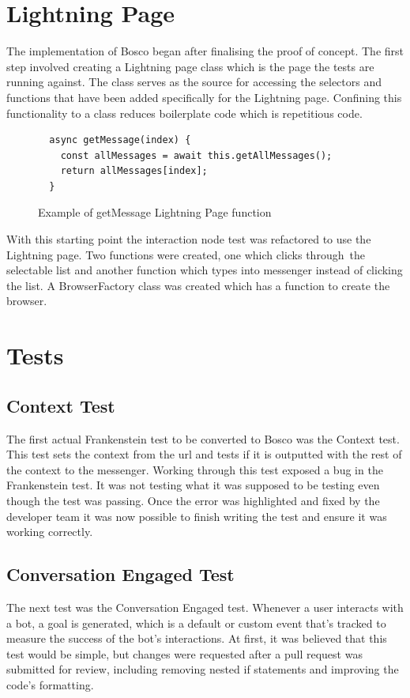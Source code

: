 \documentclass[12pt,a4paper,titlepage]{report}
\begin{document}
\section{Lightning Page}
The implementation of Bosco began after finalising the proof of concept. 
The first step involved creating a Lightning page class which is the page the tests are running against. 
The class serves as the source for accessing the selectors and functions that have been added specifically for the Lightning page. 
Confining this functionality to a class reduces boilerplate code which is repetitious code.

\begin{figure}[H]
 \begin{tcolorbox}
  \begin{verbatim}
  async getMessage(index) {
    const allMessages = await this.getAllMessages();
    return allMessages[index];
  }
  \end{verbatim}
 \end{tcolorbox}
 \caption{Example of getMessage Lightning Page function}
\end{figure}

With this starting point the interaction node test was refactored to use the Lightning page. Two functions were
created, one which clicks through the selectable list and another function which types into messenger instead of
clicking the list. A BrowserFactory class was created which has a function to create the browser.

\section{Tests}
\subsection{Context Test}
The first actual Frankenstein test to be converted to Bosco was the Context test. This test sets the context from the url
and tests if it is outputted with the rest of the context to the messenger. Working through this test exposed a bug in the Frankenstein test. 
It was not testing what it was supposed to be testing even though the test was passing. Once the error was highlighted and fixed by the developer team it was now possible to finish writing the test
and ensure it was working correctly. 

\subsection{Conversation Engaged Test}
The next test was the Conversation Engaged test. Whenever a user interacts with a bot, a goal is generated, which is a default or custom event that's tracked to measure the success of the bot's interactions.
At first, it was believed that this test would be simple, but changes were requested after a pull request was submitted for review, including removing nested if statements and improving the code's formatting.
\end{document}
